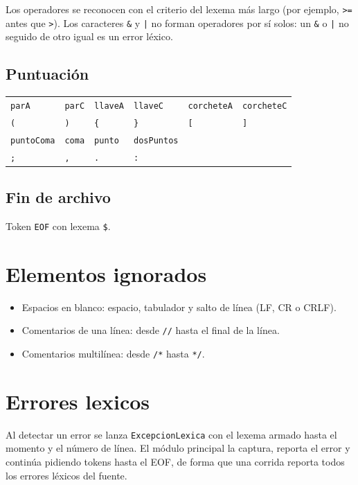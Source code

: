 \documentclass[11pt,a4paper]{article}
\begin{document}
\medskip
\noindent
Los operadores se reconocen con el criterio del lexema más largo (por ejemplo, \texttt{>=}
antes que \texttt{>}). Los caracteres \texttt{\&} y \verb!|! no forman operadores por sí solos:
un \texttt{\&} o \verb!|! no seguido de otro igual es un error léxico.

\subsection{Puntuación}

\begin{center}
\begin{tabular}{|l|l|l|l|l|l|}
\hline
\texttt{parA} & \texttt{parC} & \texttt{llaveA} & \texttt{llaveC} & \texttt{corcheteA} & \texttt{corcheteC} \\
\texttt{(} & \texttt{)} & \verb!{! & \verb!}! & \texttt{[} & \texttt{]} \\ \hline
\texttt{puntoComa} & \texttt{coma} & \texttt{punto} & \texttt{dosPuntos} & & \\
\texttt{;} & \texttt{,} & \texttt{.} & \texttt{:} & & \\ \hline
\end{tabular}
\end{center}

\subsection{Fin de archivo}

Token \texttt{EOF} con lexema \verb!$!.

\section{Elementos ignorados}

\begin{itemize}
  \item Espacios en blanco: espacio, tabulador y salto de línea (LF, CR o CRLF).
  \item Comentarios de una línea: desde \texttt{//} hasta el final de la línea.
  \item Comentarios multilínea: desde \texttt{/*} hasta \texttt{*/}.
\end{itemize}

\section{Errores lexicos}

Al detectar un error se lanza \texttt{ExcepcionLexica} con el lexema armado hasta el momento y
el número de línea. El módulo principal la captura, reporta el error y continúa pidiendo
tokens hasta el EOF, de forma que una corrida reporta todos los errores léxicos del fuente.
\end{document}
